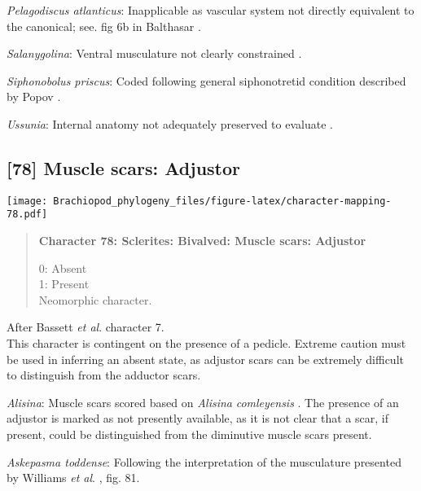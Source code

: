 \documentclass[openany]{book}
\theoremstyle{definition}
\theoremstyle{definition}
\theoremstyle{definition}
\theoremstyle{remark}
\begin{document}
\hypertarget{Pelagodiscus_atlanticus-coding-77}{}
\emph{Pelagodiscus atlanticus}: Inapplicable as vascular system not
directly equivalent to the canonical; see. fig 6b in Balthasar
\citeyearpar{Balthasar2009Thebrachiopod}.

\hypertarget{Salanygolina-coding-77}{}
\emph{Salanygolina}: Ventral musculature not clearly constrained
\citep{Holmer2009Theenigmatic}.

\hypertarget{Siphonobolus_priscus-coding-77}{}
\emph{Siphonobolus priscus}: Coded following general siphonotretid
condition described by Popov \citeyearpar[p.~407]{Popov1992TheCambrian}.

\hypertarget{Ussunia-coding-77}{}
\emph{Ussunia}: Internal anatomy not adequately preserved to evaluate
\citep{Nikitin1984}.

\subsection*{{[}78{]} Muscle scars:
Adjustor}\label{muscle-scars-adjustor}

\texttt{[image: Brachiopod\_phylogeny\_files/figure-latex/character-mapping-78.pdf]}

\begin{quote}
\textbf{Character 78: Sclerites: Bivalved: Muscle scars: Adjustor}

0: Absent\\
1: Present\\
Neomorphic character.
\end{quote}

After Bassett \emph{et al}.
\citeyearpar{Bassett2001Functionalmorphology} character 7.\\
This character is contingent on the presence of a pedicle. Extreme
caution must be used in inferring an absent state, as adjustor scars can
be extremely difficult to distinguish from the adductor scars.

\hypertarget{Alisina-coding-78}{}
\emph{Alisina}: Muscle scars scored based on \emph{Alisina}
\emph{comleyensis} \citep{Bassett2001Functionalmorphology}. The presence
of an adjustor is marked as not presently available, as it is not clear
that a scar, if present, could be distinguished from the diminutive
muscle scars present.

\hypertarget{Askepasma_toddense-coding-78}{}
\emph{Askepasma toddense}: Following the interpretation of the
musculature presented by Williams \emph{et al}.
\citeyearpar{Williams2000LinguliformeaCraniiformea}, fig. 81.
\end{document}

